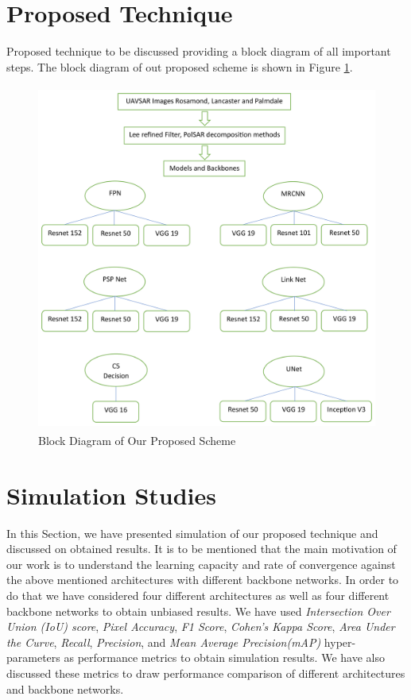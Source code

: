 \documentclass[a4paper,12pt]{spieman}  %
\begin{document}
\begin{spacing}{1}
\section{Proposed Technique}
Proposed technique to be discussed providing a block diagram of all important steps. The block diagram of out proposed scheme is shown in Figure \ref{BlockD}.
\begin{figure}[h!]
\centering
\includegraphics[width=4.5in, height=4.5in]{methodology.png} %
\caption{Block Diagram of Our Proposed Scheme}
\label{BlockD}
\end{figure}
\section{Simulation Studies}
In this Section, we have presented simulation of our proposed technique and discussed on obtained results. It is to be mentioned that the main motivation of our work is to understand the learning capacity and rate of convergence against the above mentioned architectures with different backbone networks. In order to do that we have considered four different architectures as well as four different backbone networks to obtain unbiased results. We have used \emph{Intersection Over Union (IoU) score}, \emph{Pixel Accuracy}, \emph{F1 Score}, \emph{Cohen's Kappa Score}, \emph{Area Under the Curve}, \emph{Recall}, \emph{Precision}, and \emph{Mean Average Precision(mAP)} hyper-parameters as performance metrics to obtain simulation results. We have also discussed these metrics to draw performance comparison of different architectures and backbone networks.

\end{spacing}
\end{document}
